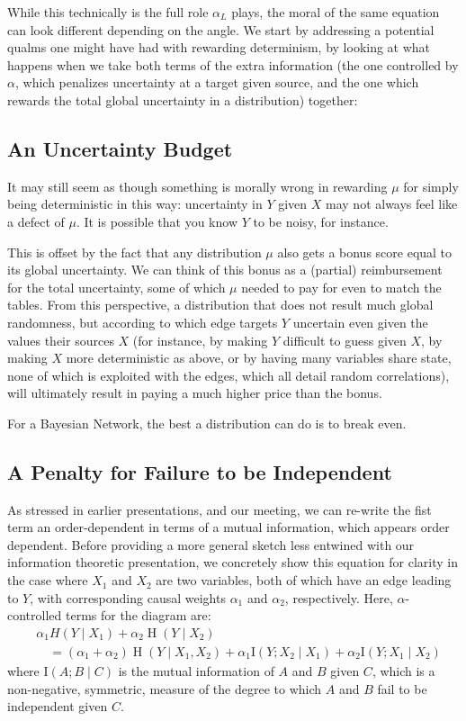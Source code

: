 \documentclass{article}
\renewcommand{\H}{\mathop{\mathrm H}}
\begin{document}
While this technically is the full role $\alpha_L$ plays, the moral of the same equation can look different depending on the angle. We start by addressing a potential qualms one might have had with rewarding determinism, by looking at what happens when we take both terms of the extra information (the one controlled by $\alpha$, which penalizes uncertainty at a target given source, and the one which rewards the total global uncertainty in a distribution) together:

\subsection*{An Uncertainty Budget}

It may still seem as though something is morally wrong in rewarding $\mu$ for simply being deterministic in this way: uncertainty in $Y$ given $X$ may not always feel like a defect of $\mu$. It is possible that you know $Y$ to be 
noisy, for instance.

This is offset by the fact that any distribution $\mu$ also gets a bonus score equal to its global uncertainty. We can think of this bonus as a (partial) reimbursement for the total uncertainty, some of which $\mu$ needed to pay for even to match the tables. From this perspective, a distribution that does not result much global randomness, but according to which edge targets $Y$ uncertain even given the values their sources $X$ (for instance, by making $Y$ difficult to guess given $X$, by making $X$ more deterministic as above, or by having many variables share state, none of which is exploited with the edges, which all detail random correlations), will ultimately result in paying a much higher price than the bonus. 

For a Bayesian Network, the best a distribution can do is to break even.

\subsection*{A Penalty for Failure to be Independent}
As stressed in earlier presentations, and our meeting, we can re-write the fist term an order-dependent in terms of a mutual information, which appears order dependent. Before providing a more general sketch less entwined with our information theoretic presentation, we concretely show this equation for clarity in the case where $X_1$ and $X_2$ are two variables, both of which have an edge leading to $Y$, with corresponding causal weights $\alpha_1$ and $\alpha_2$, respectively. Here, $\alpha$-controlled terms for the diagram are:
\begin{align*}
	&\alpha_1 H(Y \mid X_1) + \alpha_2 \H(Y \mid X_2) \\
	&\quad = (\alpha_1+ \alpha_2) \H(Y \mid X_1, X_2) + \alpha_1 \mathrm{I}(Y; X_2 \mid X_1 )+ \alpha_2 \mathrm{I}(Y ; X_1 \mid X_2)
\end{align*}
where $\mathrm I(A ; B \mid C)$ is the mutual information of $A$ and $B$ given $C$, which is a non-negative, symmetric, measure of the degree to which $A$ and $B$ fail to be independent given $C$.
\end{document}

